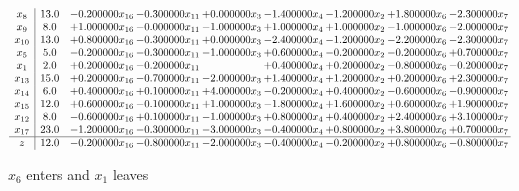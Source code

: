\documentclass[10pt]{article}
\begin{document}
 \[\begin{array}{c| c c@{\hskip 2pt} c@{\hskip 2pt} c@{\hskip 2pt} c@{\hskip 2pt} c@{\hskip 2pt} c@{\hskip 2pt} c@{\hskip 2pt} }
 x_{8}   &  13.0 & -0.200000 x_{16} & -0.300000 x_{11} & + 0.000000 x_{3} & -1.400000 x_{4} & -1.200000 x_{2} & + 1.800000 x_{6} & -2.300000 x_{7}\\
 x_{9}   &  8.0 & + 1.000000 x_{16} & -0.000000 x_{11} & -1.000000 x_{3} & + 1.000000 x_{4} & + 1.000000 x_{2} & -1.000000 x_{6} & -2.000000 x_{7}\\
 x_{10}   &  13.0 & + 0.800000 x_{16} & -0.300000 x_{11} & + 0.000000 x_{3} & -2.400000 x_{4} & -1.200000 x_{2} & -2.200000 x_{6} & -2.300000 x_{7}\\
 x_{5}   &  5.0 & -0.200000 x_{16} & -0.300000 x_{11} & -1.000000 x_{3} & + 0.600000 x_{4} & -0.200000 x_{2} & -0.200000 x_{6} & + 0.700000 x_{7}\\
 x_{1}   &  2.0 & + 0.200000 x_{16} & -0.200000 x_{11} &   & + 0.400000 x_{4} & + 0.200000 x_{2} & -0.800000 x_{6} & -0.200000 x_{7}\\
 x_{13}   &  15.0 & + 0.200000 x_{16} & -0.700000 x_{11} & -2.000000 x_{3} & + 1.400000 x_{4} & + 1.200000 x_{2} & + 0.200000 x_{6} & + 2.300000 x_{7}\\
 x_{14}   &  6.0 & + 0.400000 x_{16} & + 0.100000 x_{11} & + 4.000000 x_{3} & -0.200000 x_{4} & + 0.400000 x_{2} & -0.600000 x_{6} & -0.900000 x_{7}\\
 x_{15}   &  12.0 & + 0.600000 x_{16} & -0.100000 x_{11} & + 1.000000 x_{3} & -1.800000 x_{4} & + 1.600000 x_{2} & + 0.600000 x_{6} & + 1.900000 x_{7}\\
 x_{12}   &  8.0 & -0.600000 x_{16} & + 0.100000 x_{11} & -1.000000 x_{3} & + 0.800000 x_{4} & + 0.400000 x_{2} & + 2.400000 x_{6} & + 3.100000 x_{7}\\
 x_{17}   &  23.0 & -1.200000 x_{16} & -0.300000 x_{11} & -3.000000 x_{3} & -0.400000 x_{4} & + 0.800000 x_{2} & + 3.800000 x_{6} & + 0.700000 x_{7}\\
\hline
z    &  12.0 & -0.200000 x_{16} & -0.800000 x_{11} & -2.000000 x_{3} & -0.400000 x_{4} & -0.200000 x_{2} & + 0.800000 x_{6} & -0.800000 x_{7}\\
\end{array}\]


 $ x_{6} $ enters and $ x_{1} $ leaves 
\end{document}
